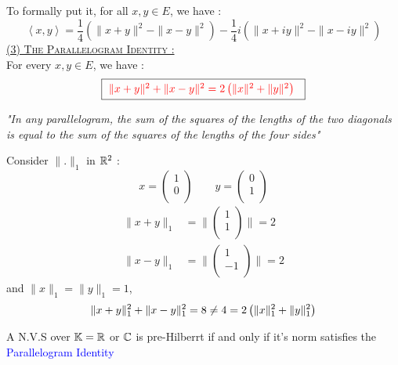 To formally put it, for all $x,y \in E $, we have : 
\[
\left\langle x,y \right\rangle = 
\frac{1}{4}
\left( 
  \| x+y \| ^2  - \| x-y \| ^2 
\right) - \frac{1}{4} i
\left( 
  \| x+iy \| ^2 - \| x-iy \|^2 
\right)
\]
\textsc{\underline{(3) The Parallelogram Identity : \lefthand }} \\
For every $x,y \in E $, we have : 
\[
  \fbox{
    \textcolor{red}{
    $ \| x+y \| ^2  + \| x-y \| ^2  = 2 \left( \|x  \|^2 + \| y \| ^2   \right) $ 
    }
  }
\]
\begin{center}
\it
"In any parallelogram, the sum of the squares of the lengths of the two diagonals is equal
to the sum of the squares of the lengths of the four sides"
\normalfont
\end{center}
\begin{example}
  Consider $\| . \| _{1} $  in $\mathbb{R} ^2  $ : 
  \[
  x = 
\begin{pmatrix}
  1 \\
  0 \\
\end{pmatrix} \quad \quad 
  y = 
\begin{pmatrix}
  0 \\
  1 \\
\end{pmatrix}
  \]
  \begin{align*}
    \| x+y \| _{1} &= 
    \| 
\begin{pmatrix}
  1 \\
  1 \\
\end{pmatrix}
    \|  = 2 
    \\
    \| x-y \| _{1} &= 
    \| 
\begin{pmatrix}
  1 \\
  -1 \\
\end{pmatrix}
    \|  = 2 
  \end{align*}
  and $\| x \|_{1} = \| y \| _{1} = 1 $, 
  \[
  \| x+y \| _{1}^2 + \| x-y \| _{1}^2  = 8 
  \large \neq  
  \normalfont 
  4 = 
  2 \left( 
    \| x \| _{1}^2  + \| y \| _{1}^2 
  \right) 
  \]
\end{example}
\begin{theorem}
  A N.V.S over $\mathbb{K}= \mathbb{R}  $ or $\mathbb{C}  $ is pre-Hilberrt 
  if and only if it's norm satisfies the \textcolor{blue}{Parallelogram Identity}
\end{theorem}
